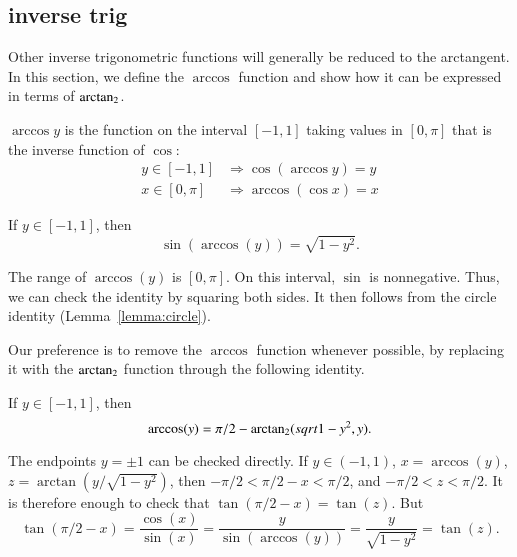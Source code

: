 \subsection{inverse trig}

Other inverse trigonometric functions will generally be reduced to
the arctangent.  In this section, we define the $\arccos$ function and show how it can be expressed in terms of ${\operatorname{arctan_2}}$.

\begin{definition}[arccos]\label{def:arccos}
$\arccos y$ is the function on the interval $[-1,1]$
taking values in $[0,\pi]$ that is the inverse function of $\cos$:
    $$\begin{array}{lll}
        y\in [-1,1] &\Rightarrow \cos(\arccos y) = y\\
        x\in[0,\pi] &\Rightarrow \arccos(\cos x) = x
    \end{array}$$
\end{definition}

\begin{lemma}\label{lemma:sin-arccos} 
If $y\in[-1,1]$, then
    $$\sin(\arccos(y)) = \sqrt{1-y^2}.$$
\end{lemma}

\begin{proved}
    The range of $\arccos(y)$ is $[0,\pi]$.  On this interval, $\sin$
    is nonnegative.  Thus, we can check the identity by squaring
    both sides.  It then follows from the circle identity
    (Lemma~\ref{lemma:circle}).
\swallowed\end{proved}


Our preference is to remove the $\arccos$ function whenever
possible, by replacing it with the ${\operatorname{arctan_2}}$ function through the
following identity.  


\begin{lemma}\label{lemma:arccos-arctan}  
If $y\in [-1,1]$, then
    $$\arccos(y) = \pi/2 - {\operatorname{arctan_2}}({ sqrt{1-y^2}},{y}).$$
\end{lemma}

\begin{proved}
The endpoints $y=\pm1$ can be checked directly.
If $y\in (-1,1)$,  $x = \arccos(y)$, 
$z = \arctan(y/\sqrt{1-y^2})$, then
    $-\pi/2 < \pi/2 - x < \pi/2$, and $-\pi/2 < z < \pi/2$.  It is
    therefore enough to check that
        $\tan(\pi/2 - x) = \tan(z)$.
    But
        $$\tan(\pi/2-x) = \frac{\cos(x)}{\sin(x)} = \frac{y}{
        \sin(\arccos(y))} = \frac{y}{ \sqrt{1-y^2}} = \tan(z).$$
\swallowed\end{proved}

